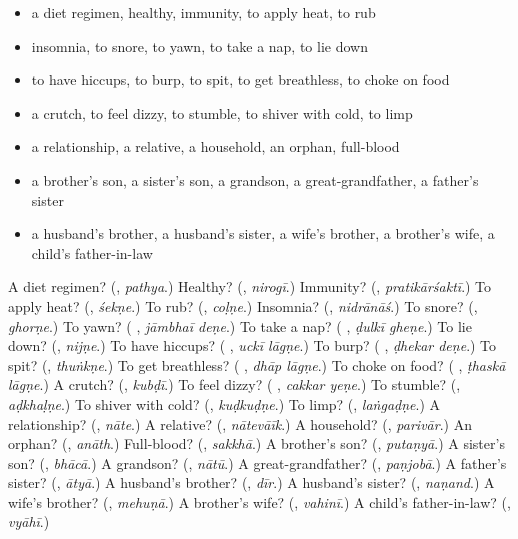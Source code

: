 \begin{itemize}
\raggedright
  \item a diet regimen, healthy, immunity, to apply heat, to rub
  \item insomnia, to snore, to yawn, to take a nap, to lie down
  \item to have hiccups, to burp, to spit, to get breathless, to choke on food
  \item a crutch, to feel dizzy, to stumble, to shiver with cold, to limp
  \item a relationship, a relative, a household, an orphan, full-blood
  \item a brother's son, a sister's son, a grandson, a great-grandfather, a father's sister
  \item a husband's brother, a husband's sister, a wife's brother, a brother's wife, a child's father-in-law
\end{itemize}

\begin{tcolorbox}[breakable,colback=teal!4,colframe=teal!35!black,title={Before you move on}]
A diet regimen? (\textbf{}, \emph{pathya}.) Healthy? (\textbf{}, \emph{nirogī}.) Immunity? (\textbf{}, \emph{pratikārśaktī}.) To apply heat? (\textbf{}, \emph{śekṇe}.) To rub? (\textbf{}, \emph{coḷṇe}.) Insomnia? (\textbf{}, \emph{nidrānāś}.) To snore? (\textbf{}, \emph{ghorṇe}.) To yawn? (\textbf{ }, \emph{jāmbhaī deṇe}.) To take a nap? (\textbf{ }, \emph{ḍulkī gheṇe}.) To lie down? (\textbf{}, \emph{nijṇe}.) To have hiccups? (\textbf{ }, \emph{uckī lāgṇe}.) To burp? (\textbf{ }, \emph{ḍhekar deṇe}.) To spit? (\textbf{}, \emph{thuṅkṇe}.) To get breathless? (\textbf{ }, \emph{dhāp lāgṇe}.) To choke on food? (\textbf{ }, \emph{ṭhaskā lāgṇe}.) A crutch? (\textbf{}, \emph{kubḍī}.) To feel dizzy? (\textbf{ }, \emph{cakkar yeṇe}.) To stumble? (\textbf{}, \emph{aḍkhaḷṇe}.) To shiver with cold? (\textbf{}, \emph{kuḍkuḍṇe}.) To limp? (\textbf{}, \emph{laṅgaḍṇe}.) A relationship? (\textbf{}, \emph{nāte}.) A relative? (\textbf{}, \emph{nātevāīk}.) A household? (\textbf{}, \emph{parivār}.) An orphan? (\textbf{}, \emph{anāth}.) Full-blood? (\textbf{}, \emph{sakkhā}.) A brother's son? (\textbf{}, \emph{putaṇyā}.) A sister's son? (\textbf{}, \emph{bhācā}.) A grandson? (\textbf{}, \emph{nātū}.) A great-grandfather? (\textbf{}, \emph{paṇjobā}.) A father's sister? (\textbf{}, \emph{ātyā}.) A husband's brother? (\textbf{}, \emph{dīr}.) A husband's sister? (\textbf{}, \emph{naṇand}.) A wife's brother? (\textbf{}, \emph{mehuṇā}.) A brother's wife? (\textbf{}, \emph{vahinī}.) A child's father-in-law? (\textbf{}, \emph{vyāhī}.)
\end{tcolorbox}

